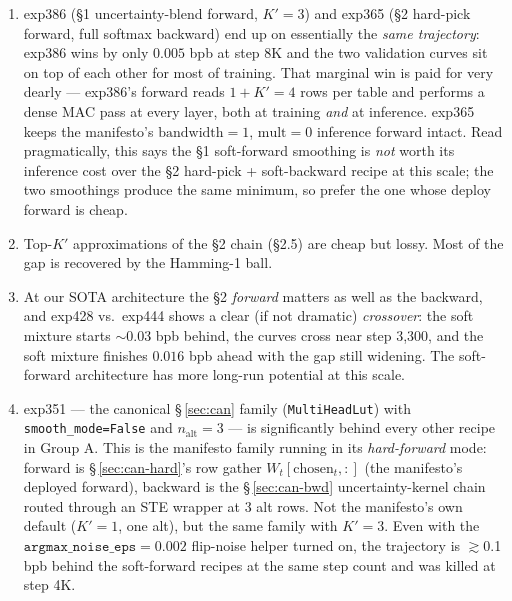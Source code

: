 \documentclass[11pt]{article}
\begin{document}
\begin{enumerate}\itemsep0pt
\item exp386 (\S1 uncertainty-blend forward, $K'{=}3$) and exp365 (\S2
  hard-pick forward, full softmax backward) end up on essentially the
  \emph{same trajectory}: exp386 wins by only $0.005$ bpb at step 8K and
  the two validation curves sit on top of each other for most of training.
  That marginal win is paid for very dearly --- exp386's forward reads
  $1{+}K'{=}4$ rows per table and performs a dense MAC pass at every
  layer, both at training \emph{and} at inference. exp365 keeps the
  manifesto's $\text{bandwidth}{=}1$, $\text{mult}{=}0$ inference forward
  intact. Read pragmatically, this says the \S1 soft-forward smoothing
  is \emph{not} worth its inference cost over the \S2 hard-pick +
  soft-backward recipe at this scale; the two smoothings produce the
  same minimum, so prefer the one whose deploy forward is cheap.
\item Top-$K'$ approximations of the \S2 chain (\S2.5) are cheap but lossy.
  Most of the gap is recovered by the Hamming-1 ball.
\item At our SOTA architecture the \S2 \emph{forward} matters as well as
  the backward, and exp428 vs.\ exp444 shows a clear (if not dramatic)
  \emph{crossover}: the soft mixture starts $\sim$0.03 bpb behind, the
  curves cross near step 3{,}300, and the soft mixture finishes
  $0.016$ bpb ahead with the gap still widening. The soft-forward
  architecture has more long-run potential at this scale.
\item exp351 --- the canonical \S\,\ref{sec:can} family
  (\texttt{MultiHeadLut}) with \texttt{smooth\_mode=False} and
  $n_{\mathrm{alt}}{=}3$ --- is significantly behind every other recipe
  in Group A. This is the manifesto family running in its
  \emph{hard-forward} mode: forward is \S\,\ref{sec:can-hard}'s row
  gather $W_t[\mathrm{chosen}_t,:]$ (the manifesto's deployed forward),
  backward is the \S\,\ref{sec:can-bwd} uncertainty-kernel chain routed
  through an STE wrapper at 3 alt rows. Not the manifesto's own default
  ($K'{=}1$, one alt), but the same family with $K'{=}3$. Even with the
  $\mathtt{argmax\_noise\_eps}{=}0.002$ flip-noise helper turned on, the
  trajectory is $\gtrsim$0.1 bpb behind the soft-forward recipes at the
  same step count and was killed at step 4K.
\end{enumerate}
\end{document}
